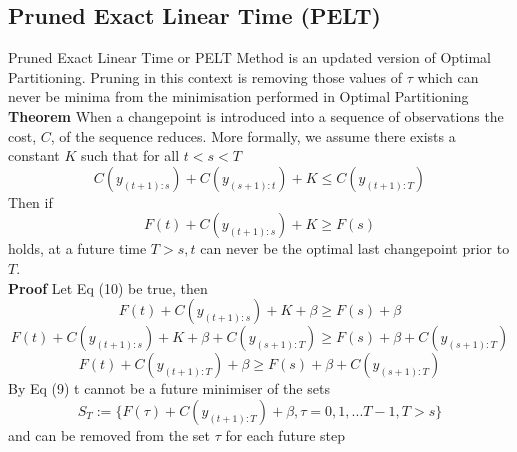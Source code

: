 \documentclass{article}
\begin{document}
\subsection{Pruned Exact Linear Time (PELT)}
Pruned Exact Linear Time or PELT Method is an updated version of Optimal Partitioning. Pruning in this context is removing those values of $\tau$ which can never be minima from the minimisation performed in Optimal Partitioning\\
\textbf{Theorem} When a changepoint is introduced into a sequence of
observations the cost, $C$, of the sequence reduces. More formally, we assume there
exists a constant $K$ such that for all $t < s < T$\\
\begin{equation}
    C(y_{(t+1) : s}) + C(y_{(s+1) : t}) + K \leq C(y_{(t+1) : T})
\end{equation}
Then if
\begin{equation}
    F(t) + C(y_{(t+1) : s}) + K \geq F(s)
\end{equation}
holds, at a future time $T > s, t$ can never be the optimal last changepoint prior to $T$.\\
\textbf{Proof} Let Eq (10) be true, then\\
$$F(t) + C(y_{(t+1) : s}) + K +\beta \geq F(s) + \beta$$
$$F(t) + C(y_{(t+1) : s}) + K +\beta + C(y_{(s+1) : T}) \geq F(s) + \beta + C(y_{(s+1) : T})$$
$$F(t) + C(y_{(t+1) : T}) +\beta \geq F(s) + \beta + C(y_{(s+1) : T})$$
By Eq (9) t cannot be a future minimiser of the sets
$$S_{T}:= \{F(\tau) + C(y_{(t+1):T}) +\beta ,\tau = 0,1,...T-1,T>s\}$$
and can be removed from the set $\tau$ for each future step
\end{document}

